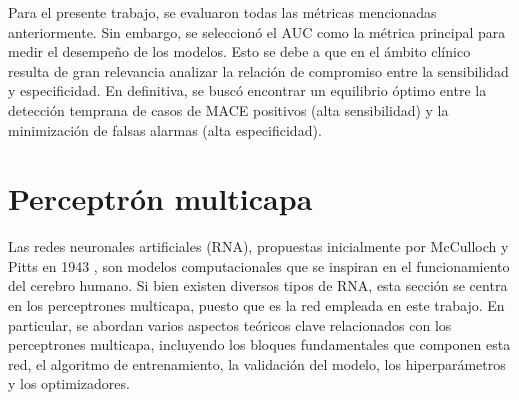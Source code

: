 Para el presente trabajo, se evaluaron todas las métricas mencionadas anteriormente. Sin embargo, se seleccionó 
el AUC como la métrica principal para medir el desempeño de los modelos. Esto se debe a que en el ámbito clínico 
resulta de gran relevancia analizar la relación de compromiso entre la sensibilidad y especificidad. En definitiva, 
se buscó encontrar un equilibrio óptimo entre la detección temprana de casos de MACE positivos (alta sensibilidad) 
y la minimización de falsas alarmas (alta especificidad). 


\filbreak
\section{Perceptrón multicapa}
\label{sec:Perceptrón multicapa}


Las redes neuronales artificiales (RNA), propuestas inicialmente por McCulloch y Pitts en 1943 
\citep{CITE:41}, son modelos computacionales que se inspiran en el funcionamiento del cerebro 
humano. Si bien existen diversos tipos de RNA, esta sección se centra en los perceptrones 
multicapa, puesto que es la red empleada en este trabajo. En particular, se abordan varios 
aspectos teóricos clave relacionados con los perceptrones multicapa, incluyendo los bloques 
fundamentales que componen esta red, el algoritmo de entrenamiento, la validación del modelo, 
los hiperparámetros y los optimizadores.

